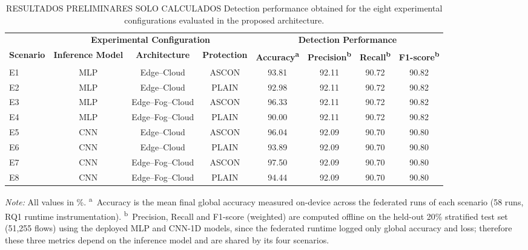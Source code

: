 \documentclass[journal,article,submit,moreauthors]{Definitions/mdpi}
\begin{document}
\begin{table}[ht]
\centering
\caption{RESULTADOS PRELIMINARES SOLO CALCULADOS Detection performance obtained for the eight experimental configurations evaluated in the proposed architecture.}
\label{tab:detection_capability}
\footnotesize
\begin{tabular}{lccccccc}
\toprule
&
\multicolumn{3}{c}{\textbf{Experimental Configuration}}
&
\multicolumn{4}{c}{\textbf{Detection Performance}}
\\
\cmidrule(lr){2-4}
\cmidrule(lr){5-8}
\textbf{Scenario} & \textbf{Inference Model} &  \textbf{Architecture} & \textbf{Protection} & \textbf{Accuracy\textsuperscript{a}} & \textbf{Precision\textsuperscript{b}} & \textbf{Recall\textsuperscript{b}} & \textbf{F1-score\textsuperscript{b}}
\\
\midrule
E1 & MLP & Edge--Cloud      & ASCON & 93.81 & 92.11 & 90.72 & 90.82 \\
E2 & MLP & Edge--Cloud      & PLAIN & 92.98 & 92.11 & 90.72 & 90.82 \\
E3 & MLP & Edge--Fog--Cloud & ASCON & 96.33 & 92.11 & 90.72 & 90.82 \\
E4 & MLP & Edge--Fog--Cloud & PLAIN & 90.00 & 92.11 & 90.72 & 90.82 \\
E5 & CNN & Edge--Cloud      & ASCON & 96.04 & 92.09 & 90.70 & 90.80 \\
E6 & CNN & Edge--Cloud      & PLAIN & 93.89 & 92.09 & 90.70 & 90.80 \\
E7 & CNN & Edge--Fog--Cloud & ASCON & 97.50 & 92.09 & 90.70 & 90.80 \\
E8 & CNN & Edge--Fog--Cloud & PLAIN & 94.44 & 92.09 & 90.70 & 90.80 \\
\bottomrule
\end{tabular}
\vspace{2mm}
\footnotesize{\textit{Note:} All values in \%. \textsuperscript{a}~Accuracy is the mean final global accuracy measured on-device across the federated runs of each scenario (58 runs, RQ1 runtime instrumentation). \textsuperscript{b}~Precision, Recall and F1-score (weighted) are computed offline on the held-out 20\% stratified test set (51{,}255 flows) using the deployed MLP and CNN-1D models, since the federated runtime logged only global accuracy and loss; therefore these three metrics depend on the inference model and are shared by its four scenarios.}
\end{table}
\end{document}
